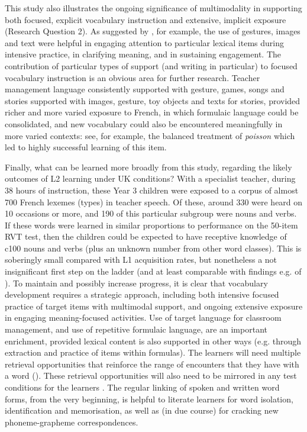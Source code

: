 \documentclass[output=paper]{langscibook}
\begin{document}
This study also illustrates the ongoing significance of multimodality in supporting both focused, explicit vocabulary instruction and extensive, implicit exposure (Research Question 2). As suggested by \citet{Syodorenko2010}, for example, the use of gestures, images and text were helpful in engaging attention to particular lexical items during intensive practice, in clarifying meaning, and in sustaining engagement. The contribution of particular types of support (and writing in particular) to focused vocabulary instruction is an obvious area for further research. Teacher management language consistently supported with gesture, games, songs and stories supported with images, gesture, toy objects and texts for stories, provided richer and more varied exposure to French, in which formulaic language could be consolidated, and new vocabulary could also be encountered meaningfully in more varied contexts: see, for example, the balanced treatment of \textit{poisson} which led to highly successful learning of this item. 

Finally, what can be learned more broadly from this study, regarding the likely outcomes of L2 learning under UK conditions? With a specialist teacher, during 38 hours of instruction, these Year 3 children were exposed to a corpus of almost 700 French lexemes (types) in teacher speech. Of these, around 330 were heard on 10 occasions or more, and 190 of this particular subgroup were nouns and verbs. If these words were learned in similar proportions to performance on the 50-item RVT test, then the children could be expected to have receptive knowledge of c100 nouns and verbs (plus an unknown number from other word classes). This is soberingly small compared with L1 acquisition rates, but nonetheless a not insignificant first step on the ladder (and at least comparable with findings e.g. of \citealt{CableEtAl2010}). To maintain and possibly increase progress, it is clear that vocabulary development requires a strategic approach, including both intensive focused practice of target items with multimodal support, and ongoing extensive exposure in engaging meaning-focused activities. Use of target language for classroom management, and use of repetitive formulaic language, are an important enrichment, provided lexical content is also supported in other ways (e.g. through extraction and practice of items within formulas). The learners will need multiple retrieval opportunities that reinforce the range of encounters that they have with a word (\citealt{KasprowiczEtAl2019,Nakata2020,Newton2020}). These retrieval opportunities will also need to be mirrored in any test conditions for the learners \citep{Nakata2020}. The regular linking of spoken and written word forms, from the very beginning, is helpful to literate learners for word isolation, identification and memorisation, as well as (in due course) for cracking new phoneme-grapheme correspondences.
\end{document}
